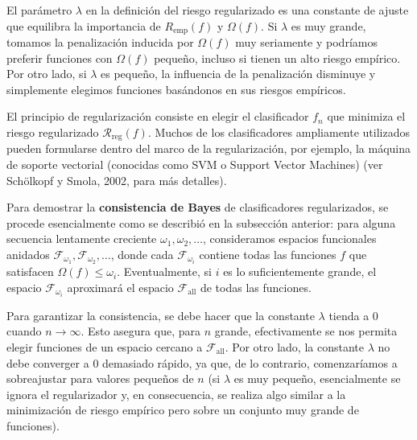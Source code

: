 \documentclass{report}
\begin{document}
El parámetro \(\lambda\) en la definición del riesgo regularizado es una constante de ajuste que equilibra la 
importancia de \(R_{\text{emp}}(f)\) y \(\Omega(f)\). Si \(\lambda\) es muy grande, tomamos la penalización 
inducida por \(\Omega(f)\) muy seriamente y podríamos preferir funciones con \(\Omega(f)\) pequeño, incluso si 
tienen un alto riesgo empírico. Por otro lado, si \(\lambda\) es pequeño, la influencia de la penalización 
disminuye y simplemente elegimos funciones basándonos en sus riesgos empíricos.\newline

El principio de regularización consiste en elegir el clasificador \(f_n\) que minimiza el riesgo regularizado 
\(\mathcal{R}_{\text{reg}}(f)\). Muchos de los clasificadores ampliamente utilizados pueden formularse dentro 
del marco de la regularización, por ejemplo, la máquina de soporte vectorial (conocidas como SVM o Support Vector Machines)
(ver Schölkopf y Smola, 2002, 
para más detalles).\newline

Para demostrar la \textbf{consistencia de Bayes} de clasificadores regularizados, se procede esencialmente como 
se describió en la subsección anterior: para alguna secuencia lentamente creciente \(\omega_1, \omega_2, \dots\), 
consideramos espacios funcionales anidados \(\mathcal{F}_{\omega_1}, \mathcal{F}_{\omega_2}, \dots\), donde cada 
\(\mathcal{F}_{\omega_i}\) contiene todas las funciones \(f\) que satisfacen \(\Omega(f) \leq \omega_i\). 
Eventualmente, si \(i\) es lo suficientemente grande, el espacio \(\mathcal{F}_{\omega_i}\) aproximará el 
espacio \(\mathcal{F}_{\text{all}}\) de todas las funciones.\newline

Para garantizar la consistencia, se debe hacer que la constante \(\lambda\) tienda a \(0\) cuando \(n \to \infty\). 
Esto asegura que, para \(n\) grande, efectivamente se nos permita elegir funciones de un espacio cercano a 
\(\mathcal{F}_{\text{all}}\). Por otro lado, la constante \(\lambda\) no debe converger a \(0\) demasiado rápido, 
ya que, de lo contrario, comenzaríamos a sobreajustar para valores pequeños de \(n\) (si \(\lambda\) es muy 
pequeño, esencialmente se ignora el regularizador y, en consecuencia, se realiza algo similar a la minimización
de riesgo empírico pero sobre un conjunto muy grande de funciones).\newline
\end{document}
